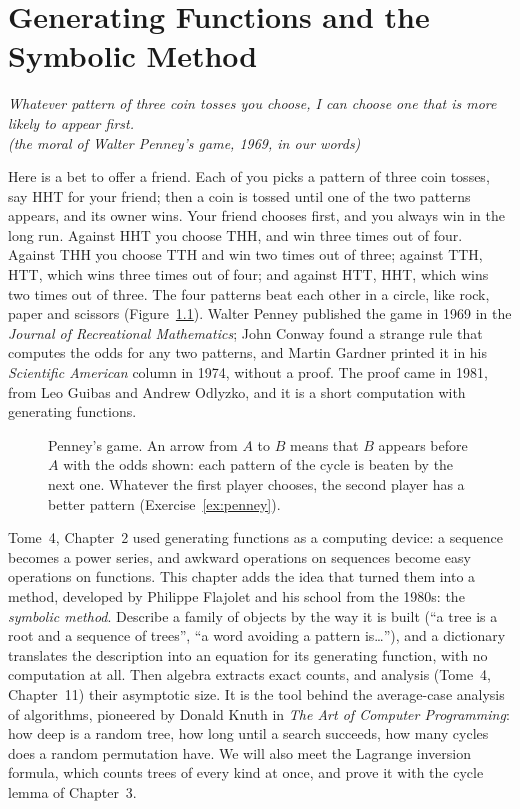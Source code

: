 \chapter{Generating Functions and the Symbolic Method}

\begin{center}\itshape
Whatever pattern of three coin tosses you choose, I can choose one that is more likely to appear first.\\
\upshape(the moral of Walter Penney's game, 1969, in our words)
\end{center}

Here is a bet to offer a friend. Each of you picks a pattern of three coin tosses, say HHT for your friend; then a coin is
tossed until one of the two patterns appears, and its owner wins. Your friend chooses first, and you always win in the
long run. Against HHT you choose THH, and win three times out of four. Against THH you choose TTH and win two times out of
three; against TTH, HTT, which wins three times out of four; and against HTT, HHT, which wins two times out of three. The
four patterns beat each other in a circle, like rock, paper and scissors (Figure~\ref{fig:penney}). Walter Penney
published the game in 1969 in the \emph{Journal of Recreational Mathematics}; John Conway found a strange rule that
computes the odds for any two patterns, and Martin Gardner printed it in his \emph{Scientific American} column in 1974, without a
proof. The proof came in 1981, from Leo Guibas and Andrew Odlyzko, and it is a short computation with generating functions.

\begin{figure}[ht]
\centering
{}
\caption{Penney's game. An arrow from $A$ to $B$ means that $B$ appears before $A$ with the odds shown: each pattern of the
cycle is beaten by the next one. Whatever the first player chooses, the second player has a better pattern
(Exercise~\ref{ex:penney}).}
\label{fig:penney}
\end{figure}

Tome~4, Chapter~2 used generating functions as a computing device: a sequence becomes a power series, and awkward
operations on sequences become easy operations on functions. This chapter adds the idea that turned them into a
method, developed by Philippe Flajolet and his school from the 1980s: the \emph{symbolic method}. Describe a family of
objects by the way it is built (``a tree is a root and a sequence of trees'', ``a word avoiding a pattern is\dots''), and a
dictionary translates the description into an equation for its generating function, with no computation at all. Then
algebra extracts exact counts, and analysis (Tome~4, Chapter~11) their asymptotic size. It is the tool behind the
average-case analysis of algorithms, pioneered by Donald Knuth in \emph{The Art of Computer Programming}: how deep is a
random tree, how long until a search succeeds, how many cycles does a random permutation have. We will also meet the
Lagrange inversion formula, which counts trees of every kind at once, and prove it with the cycle lemma of Chapter~3.

